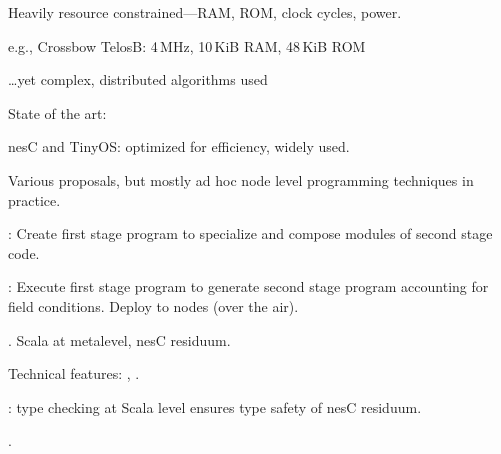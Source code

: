 
\begin{citemize}
\item Heavily resource constrained---RAM, ROM, clock cycles, power.
\item e.g., Crossbow TelosB: 4\,MHz, 10\,KiB RAM, 48\,KiB ROM
\item \ldots yet complex, distributed algorithms used
\end{citemize}

State of the art:
\begin{citemize}
\item nesC and TinyOS: optimized for efficiency, widely used.
\item Various  proposals, but mostly ad hoc node level programming
  techniques in practice.
\end{citemize}
\stopslide


\centering
{}
\begin{citemize}
\item {}: Create first stage program to specialize and compose modules of second
  stage code.
\item {}: Execute first stage program to generate second stage program
  accounting for field conditions. Deploy to nodes (over the air).
\end{citemize}
\stopslide


\begin{citemize}
\item {}. Scala at metalevel, nesC residuum.
\item Technical features: , .
\item {}: type checking at Scala level ensures type safety of nesC
  residuum.
\item {}.
\end{citemize}
\stopslide

